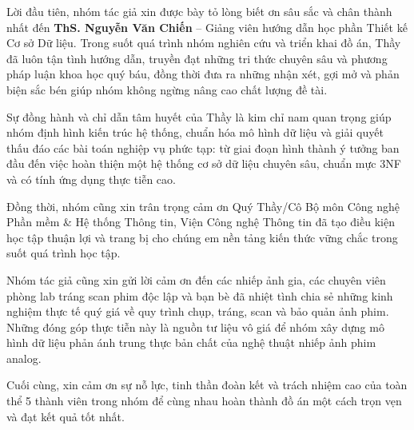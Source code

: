 
Lời đầu tiên, nhóm tác giả xin được bày tỏ lòng biết ơn sâu sắc và chân thành nhất đến \textbf{ThS. Nguyễn Văn Chiến} -- Giảng viên hướng dẫn học phần Thiết kế Cơ sở Dữ liệu. Trong suốt quá trình nhóm nghiên cứu và triển khai đồ án, Thầy đã luôn tận tình hướng dẫn, truyền đạt những tri thức chuyên sâu và phương pháp luận khoa học quý báu, đồng thời đưa ra những nhận xét, gợi mở và phản biện sắc bén giúp nhóm không ngừng nâng cao chất lượng đề tài.

Sự đồng hành và chỉ dẫn tâm huyết của Thầy là kim chỉ nam quan trọng giúp nhóm định hình kiến trúc hệ thống, chuẩn hóa mô hình dữ liệu và giải quyết thấu đáo các bài toán nghiệp vụ phức tạp: từ giai đoạn hình thành ý tưởng ban đầu đến việc hoàn thiện một hệ thống cơ sở dữ liệu chuyên sâu, chuẩn mực 3NF và có tính ứng dụng thực tiễn cao.

Đồng thời, nhóm cũng xin trân trọng cảm ơn Quý Thầy/Cô Bộ môn Công nghệ Phần mềm \& Hệ thống Thông tin, Viện Công nghệ Thông tin đã tạo điều kiện học tập thuận lợi và trang bị cho chúng em nền tảng kiến thức vững chắc trong suốt quá trình học tập.

Nhóm tác giả cũng xin gửi lời cảm ơn đến các nhiếp ảnh gia, các chuyên viên phòng lab tráng scan phim độc lập và bạn bè đã nhiệt tình chia sẻ những kinh nghiệm thực tế quý giá về quy trình chụp, tráng, scan và bảo quản ảnh phim. Những đóng góp thực tiễn này là nguồn tư liệu vô giá để nhóm xây dựng mô hình dữ liệu phản ánh trung thực bản chất của nghệ thuật nhiếp ảnh phim analog.

Cuối cùng, xin cảm ơn sự nỗ lực, tinh thần đoàn kết và trách nhiệm cao của toàn thể 5 thành viên trong nhóm để cùng nhau hoàn thành đồ án một cách trọn vẹn và đạt kết quả tốt nhất.